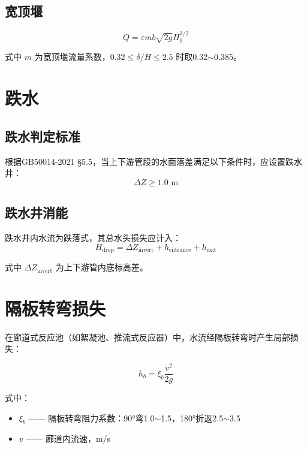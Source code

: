 \documentclass[12pt,a4paper]{ctexart}
\begin{document}
\subsection{宽顶堰}

\begin{equation}
    Q = \varepsilon m b \sqrt{2g} H_0^{3/2}
    \label{eq:broad_weir}
\end{equation}

式中 $m$ 为宽顶堰流量系数，$0.32 \leq \delta/H \leq 2.5$ 时取0.32$\sim$0.385。

\section{跌水}

\subsection{跌水判定标准}

根据GB50014-2021 §5.5，当上下游管段的水面落差满足以下条件时，应设置跌水井：
\begin{equation}
    \Delta Z \geq 1.0 \text{ m}
    \label{eq:drop_threshold}
\end{equation}

\subsection{跌水井消能}

跌水井内水流为跌落式，其总水头损失应计入：
\begin{equation}
    H_{\text{drop}} = \Delta Z_{\text{invert}} + h_{\text{entrance}} + h_{\text{exit}}
    \label{eq:drop_total}
\end{equation}

式中 $\Delta Z_{\text{invert}}$ 为上下游管内底标高差。

\section{隔板转弯损失}

在廊道式反应池（如絮凝池、推流式反应器）中，水流经隔板转弯时产生局部损失：

\begin{equation}
    h_b = \xi_b \frac{v^2}{2g}
    \label{eq:baffle}
\end{equation}

式中：
\begin{itemize}[nosep]
    \item $\xi_b$ —— 隔板转弯阻力系数：90°弯1.0$\sim$1.5，180°折返2.5$\sim$3.5
    \item $v$ —— 廊道内流速，m/s
\end{itemize}
\end{document}
